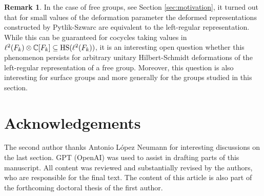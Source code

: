 \documentclass[12pt]{amsproc}
\theoremstyle{plain}
\theoremstyle{definition}
\newtheorem{remark}[theorem]{Remark}
\numberwithin{equation}{section}
\newcommand{\HS}{{\rm HS}}
\begin{document}
\begin{remark}
\label{rem:equivalence}
In the case of free groups, see Section \ref{sec:motivation}, it turned out that for small values of the deformation parameter the deformed representations constructed by Pytlik-Szwarc are equivalent to the left-regular representation. While this can be guaranteed for cocycles taking values in $\ell^2(F_k) \otimes \mathbb C[F_k] \subseteq \HS(\ell^2(F_k))$, it is an interesting open question whether this phenomenon persists for arbitrary unitary Hilbert-Schmidt deformations of the left-regular representation of a free group. Moreover, this question is also interesting for surface groups and more generally for the groups studied in this section.
\end{remark}

\section*{Acknowledgements}

The second author thanks Antonio L\'opez Neumann for interesting discussions on the last section. GPT (OpenAI) was used to assist in drafting parts of this manuscript. All content was reviewed and substantially revised by the authors, who are responsible for the final text. The content of this article is also part of the forthcoming doctoral thesis of the first author.
\end{document}
